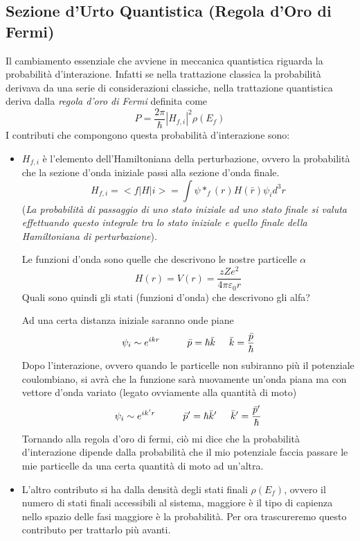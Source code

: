 \subsection{Sezione d'Urto Quantistica (Regola d'Oro di Fermi)}
Il cambiamento essenziale che avviene in meccanica quantistica riguarda la probabilità d'interazione. Infatti se nella trattazione classica la probabilità derivava da una serie di considerazioni classiche, nella trattazione quantistica deriva dalla \emph{regola d'oro di Fermi} definita come
\begin{equation}
P=\frac{2\pi}{\hbar}|H_{f,i}|^2\rho(E_f)
\end{equation}
I contributi che compongono questa probabilità d'interazione sono:
\begin{itemize}
\item $H_{f,i}$ è l'elemento dell'Hamiltoniana della perturbazione, ovvero la probabilità che la sezione d'onda iniziale passi alla sezione d'onda finale.
\begin{equation}
H_{f,i}=<f|H|i>=\int \psi*_f(r)H(\bar r)\psi_i d^3r
\end{equation}
(\emph{La probabilità di passaggio di uno stato iniziale ad uno stato finale si valuta effettuando questo integrale tra lo stato iniziale e quello finale della Hamiltoniana di perturbazione}).

Le funzioni d'onda sono quelle che descrivono le nostre particelle $\alpha$
\begin{equation}
H(r)=V(r)=\frac{zZe^2}{4\pi \varepsilon_0r}
\end{equation}
Quali sono quindi gli stati (funzioni d'onda) che descrivono gli alfa?

Ad una certa distanza iniziale saranno onde piane
\begin{equation}
\psi_i \sim e^{ikr} \hspace{1cm}\bar p=\hbar\bar k\hspace{0.5cm}\bar k=\frac{\bar p}{\hbar}
\end{equation}
Dopo l'interazione, ovvero quando le particelle non subiranno più il potenziale coulombiano, si avrà che la funzione sarà nuovamente un'onda piana ma con vettore d'onda variato (legato ovviamente alla quantità di moto)
\begin{equation}
\psi_i \sim e^{ik'r}\hspace{1cm} \bar p'=\hbar\bar k'\hspace{0.5cm}\bar k'=\frac{\bar p'}{\hbar}
\end{equation}
Tornando alla regola d'oro di fermi, ciò mi dice che la probabilità d'interazione dipende dalla probabilità che il mio potenziale faccia passare le mie particelle da una certa quantità di moto ad un'altra.

\item L'altro contributo si ha dalla densità degli stati finali $\rho(E_f)$, ovvero il numero di stati finali accessibili al sistema, maggiore è il tipo di capienza nello spazio delle fasi maggiore è la probabilità. Per ora trascureremo questo contributo per trattarlo più avanti.
\end{itemize}

